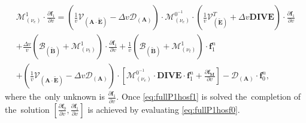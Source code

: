 \documentclass[preprint,12pt]{elsarticle}
\newcommand{\pdv}[2]{\frac{\partial{#1}}{\partial{#2}}}
\newcommand{\vect}[1]{\boldsymbol{#1}}
\newcommand{\matr}[1]{\mathbf{#1}}
\newcommand{\nue}{\nu_{e}}
\newcommand{\nutot}{\nu_{t}}
\newcommand{\vmag}{v}
\newcommand{\tE}{\vect{\tilde{E}}}
\newcommand{\tB}{\vect{\tilde{B}}}
\newcommand{\fM}{f_M}
\newcommand{\vfzero}{\vect{f}_0}
\newcommand{\fone}{\vect{f}_1}
\newcommand{\MA}{\matr{A}}
\newcommand{\IM}{\boldsymbol{\mathcal{M}}}
\newcommand{\ID}{\boldsymbol{\mathcal{D}}}
\newcommand{\IV}{\boldsymbol{\mathcal{V}}}
\newcommand{\IB}{\boldsymbol{\mathcal{B}}}
\begin{document}
\begin{multline}
  \IM^1_{(\nue)} \cdot \pdv{\fone}{\vmag}  
  = 
  \left(\frac{1}{\vmag}\IV_{\left(\MA \cdot \tE\right)}
  - \Delta\vmag \ID_{\left(\MA\right)} \right) \cdot
  \IM^{0^{-1}}_{(\nue)} \cdot 
  \left(\frac{1}{\vmag} \IV^T_{\left(\tE\right)} 
  + \Delta\vmag \matr{DIVE}
  \right)
  \cdot \pdv{\fone}{\vmag}
  \\
  +\frac{\Delta\vmag}{\vmag}\left(\IB_{\left( \tB \right)} 
  + \IM^1_{\left( \nutot \right)}\right) 
  \cdot \pdv{\fone}{\vmag} + 
  \frac{1}{\vmag}\left(\IB_{\left( \tB \right)} 
  + \IM^1_{\left( \nutot \right)}\right) 
  \cdot \fone^n\\ 
  +\left(\frac{1}{\vmag}\IV_{\left(\MA \cdot \tE\right)}
  - \Delta\vmag \ID_{\left(\MA\right)} \right) \cdot
  \left[  
  \IM^{0^{-1}}_{(\nue)} \cdot \matr{DIVE}\cdot\fone^n 
  + \pdv{\vect{\fM}}{\vmag}
  \right] - \ID_{\left(\MA\right)}\cdot\vfzero^n,
  \label{eq:fullP1hosf1}
\end{multline}
where the~only unknown is $\pdv{\fone}{\vmag}$. Once \eqref{eq:fullP1hosf1}
is solved the~completion of the~solution 
$[\pdv{\vfzero}{\vmag}, \pdv{\fone}{\vmag}]$ is achieved by evaluating 
\eqref{eq:fullP1hosf0}.
\cite{Dobrev_Kolev_Rieben-High-order_curvilinear_finite_element_methods_for_Lagrangian_hydrodynamics}
\end{document}
